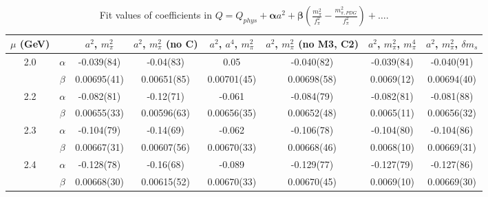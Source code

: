 \documentclass[12pt]{extarticle}
\begin{document}
\begin{table}[h!]
\begin{center}
\begin{tabular}{|c c|c|c|c|c|c|c|}
\hline
$\mu$ (GeV) &  & $a^2$, $m_\pi^2$& $a^2$, $m_\pi^2$ (no C)& $a^2$, $a^4$, $m_\pi^2$& $a^2$, $m_\pi^2$ (no M3, C2)& $a^2$, $m_\pi^2$, $m_\pi^4$& $a^2$, $m_\pi^2$, $\delta m_s$\\
\hline
\multirow{2}{0.5in}{2.0} & $\alpha$ & -0.039(84)& -0.04(83)& 0.05& -0.040(82)& -0.039(84)& -0.040(91)\\
 & $\beta$ & 0.00695(41)& 0.00651(85)& 0.00701(45)& 0.00698(58)& 0.0069(12)& 0.00694(40)\\
\hline
\multirow{2}{0.5in}{2.2} & $\alpha$ & -0.082(81)& -0.12(71)& -0.061& -0.084(79)& -0.082(81)& -0.081(88)\\
 & $\beta$ & 0.00655(33)& 0.00596(63)& 0.00656(35)& 0.00652(48)& 0.0065(11)& 0.00656(32)\\
\hline
\multirow{2}{0.5in}{2.3} & $\alpha$ & -0.104(79)& -0.14(69)& -0.062& -0.106(78)& -0.104(80)& -0.104(86)\\
 & $\beta$ & 0.00667(31)& 0.00607(56)& 0.00670(33)& 0.00668(46)& 0.0068(10)& 0.00669(31)\\
\hline
\multirow{2}{0.5in}{2.4} & $\alpha$ & -0.128(78)& -0.16(68)& -0.089& -0.129(77)& -0.127(79)& -0.127(86)\\
 & $\beta$ & 0.00668(30)& 0.00615(52)& 0.00670(33)& 0.00670(45)& 0.0069(10)& 0.00669(30)\\
\hline
\end{tabular}
\caption{Fit values of coefficients in $Q = Q_{phys} + \mathbf{\alpha} a^2 + \mathbf{\beta}\left(\frac{m_\pi^2}{f_\pi^2}-\frac{m_{\pi,PDG}^2}{f_\pi^2}\right) + \ldots$.}
\end{center}
\end{table}
























\clearpage
\end{document}
